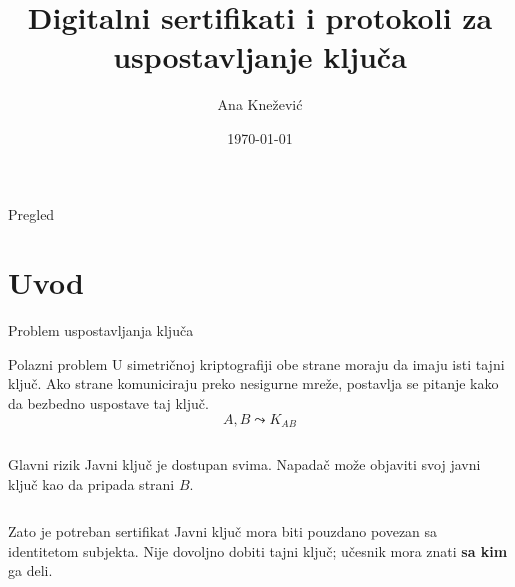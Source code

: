 \documentclass[aspectratio=1610]{beamer}
\title{Digitalni sertifikati i protokoli za uspostavljanje ključa}
\author{Ana Knežević}
\date{\today}
\begin{document}
\begin{frame}
    \titlepage
\end{frame}

\begin{frame}[t]{Pregled}
    \tableofcontents
\end{frame}

\section{Uvod}

\begin{frame}[t]{Problem uspostavljanja ključa}
\small

\begin{block}{Polazni problem}
U simetričnoj kriptografiji obe strane moraju da imaju isti tajni ključ. 
Ako strane komuniciraju preko nesigurne mreže, postavlja se pitanje kako da bezbedno uspostave taj ključ.
\[
A, B \leadsto K_{AB}
\]
\end{block}

\vspace{0.35em}

\begin{columns}[T,onlytextwidth]
\begin{alertblock}{Glavni rizik}
Javni ključ je dostupan svima. Napadač može objaviti svoj javni ključ kao da pripada strani $B$.
\end{alertblock}

\centering
{}
\end{columns}

\vspace{0.45em}

\begin{block}{Zato je potreban sertifikat}
Javni ključ mora biti pouzdano povezan sa identitetom subjekta. 
Nije dovoljno dobiti tajni ključ; učesnik mora znati \textbf{sa kim} ga deli.
\end{block}

\end{frame}
\end{document}
